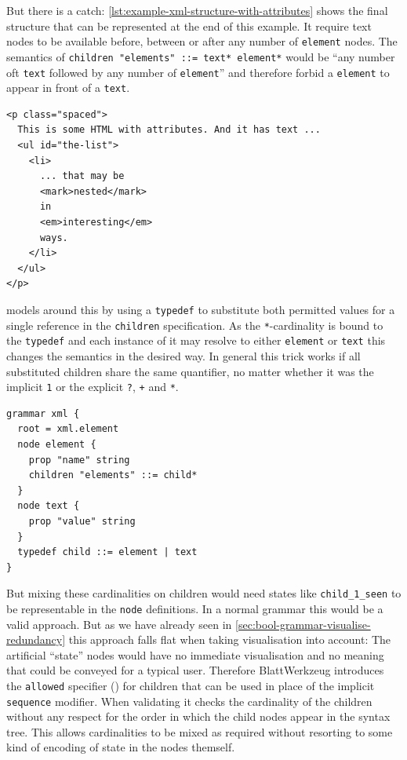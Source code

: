 \documentclass[]{report}
\begin{document}
But there is a catch: \cref{lst:example-xml-structure-with-attributes} shows the final structure that can be represented at the end of this example. It require text nodes to be available before, between or after any number of \texttt{element} nodes. The semantics of \texttt{children "elements" ::= text* element*} would be \enquote{any number oft \texttt{text} followed by any number of \texttt{element}} and therefore forbid a \texttt{element} to appear in front of a \texttt{text}.

\begin{listing}[htb]
\begin{verbatim}
<p class="spaced">
  This is some HTML with attributes. And it has text ...
  <ul id="the-list">
    <li>
      ... that may be
      <mark>nested</mark>
      in
      <em>interesting</em>
      ways.
    </li>
  </ul>
</p>
\end{verbatim}
\caption{Example HTML: Some attributes, mixed text and elements}
\label{lst:example-xml-structure-with-attributes}
\end{listing}

 models around this by using a \texttt{typedef} to substitute both permitted values for a single reference in the \texttt{children} specification. As the \texttt{*}-cardinality is bound to the \texttt{typedef} and each instance of it may resolve to either \texttt{element} or \texttt{text} this changes the semantics in the desired way. In general this trick works if all substituted children share the same quantifier, no matter whether it was the implicit \texttt{1} or the explicit \texttt{?}, \texttt{+} and \texttt{*}.

\begin{listing}[H]
\begin{verbatim}
grammar xml {
  root = xml.element
  node element {
    prop "name" string
    children "elements" ::= child*
  }
  node text {
    prop "value" string
  }
  typedef child ::= element | text
}
\end{verbatim}
\caption{XML Grammar: Using \texttt{typedef} for order independent children}
\label{lst:xml-grammar-no-allowed-typedef}
\end{listing}

But mixing these cardinalities on children would need states like \texttt{child\_1\_seen} to be representable in the \texttt{node} definitions. In a normal grammar this would be a valid approach. But as we have already seen in \cref{sec:bool-grammar-visualise-redundancy} this approach falls flat when taking visualisation into account: The artificial \enquote{state} nodes would have no immediate visualisation and no meaning that could be conveyed for a typical user. Therefore Blatt\-Werkzeug introduces the \texttt{allowed} specifier () for children that can be used in place of the implicit \texttt{sequence} modifier. When validating it checks the cardinality of the children without any respect for the order in which the child nodes appear in the syntax tree. This allows cardinalities to be mixed as required without resorting to some kind of encoding of state in the nodes themself.
\end{document}
